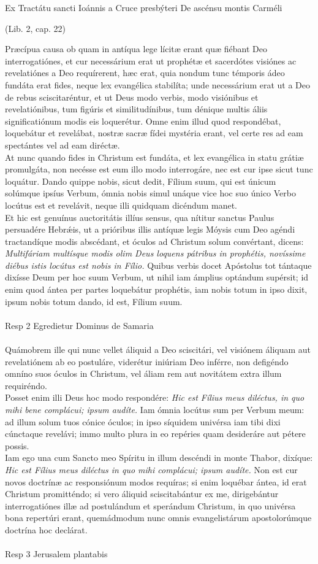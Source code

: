 \documentclass[options]{article}
\begin{document}
Ex Tractátu sancti Ioánnis a Cruce presbýteri De ascénsu montis Carméli
\begin{flushright}
(Lib. 2, cap. 22)	
\end{flushright}
Præcípua causa ob quam in antíqua lege lícitæ erant quæ fiébant Deo interrogatiónes, et cur necessárium erat ut prophétæ et sacerdótes visiónes ac revelatiónes a Deo requírerent, hæc erat, quia nondum tunc témporis ádeo fundáta erat fides, neque lex evangélica stabilíta; unde necessárium erat ut a Deo de rebus sciscitaréntur, et ut Deus modo verbis, modo visiónibus et revelatiónibus, tum figúris et similitudínibus, tum dénique multis áliis significatiónum modis eis loquerétur. Omne enim illud quod respondébat, loquebátur et revelábat, nostræ sacræ fídei mystéria erant, vel certe res ad eam spectántes vel ad eam diréctæ.\\
At nunc quando fides in Christum est fundáta, et lex evangélica in statu grátiæ promulgáta, non necésse est eum illo modo interrogáre, nec est cur ipse sicut tunc loquátur. Dando quippe nobis, sicut dedit, Fílium suum, qui est únicum solúmque ipsíus Verbum, ómnia nobis simul unáque vice hoc suo único Verbo locútus est et revelávit, neque illi quidquam dicéndum manet.\\
Et hic est genuínus auctoritátis illíus sensus, qua nítitur sanctus Paulus persuadére Hebr\'{æ}is, ut a prióribus illis antíquæ legis Móysis cum Deo agéndi tractandíque modis abscédant, et óculos ad Christum solum convértant, dicens: \emph{Multifáriam multísque modis olim Deus loquens pátribus in prophétis, novíssime diébus istis locútus est nobis in Fílio.} Quibus verbis docet Apóstolus tot tántaque dixísse Deum per hoc suum Verbum, ut nihil iam ámplius optándum supérsit; id enim quod ántea per partes loquebátur prophétis, iam nobis totum in ipso dixit, ipsum nobis totum dando, id est, Fílium suum.\\
\\
Resp 2 Egredietur Dominus de Samaria\\
\\
Quámobrem ille qui nunc vellet áliquid a Deo sciscitári, vel visiónem áliquam aut revelatiónem ab eo postuláre, viderétur iniúriam Deo inférre, non defigéndo omníno suos óculos in Christum, vel áliam rem aut novitátem extra illum requiréndo.\\
Posset enim illi Deus hoc modo respondére: \emph{Hic est Fílius meus diléctus, in quo mihi bene complácui; ipsum audíte.} Iam ómnia locútus sum per Verbum meum: ad illum solum tuos cónice óculos; in ipso síquidem univérsa iam tibi dixi cúnctaque revelávi; immo multo plura in eo repéries quam desideráre aut pétere possis.\\
Iam ego una cum Sancto meo Spíritu in illum descéndi in monte Thabor, dixíque: \emph{Hic est Fílius meus diléctus in quo mihi complácui; ipsum audíte.} Non est cur novos doctrínæ ac responsiónum modos requíras; si enim loquébar ántea, id erat Christum promitténdo; si vero áliquid sciscitabántur ex me, dirigebántur interrogatiónes illæ ad postulándum et sperándum Christum, in quo univérsa bona repertúri erant, quemádmodum nunc omnis evangelistárum apostolorúmque doctrína hoc declárat.\\
\\
Resp 3 Jerusalem plantabis
	
\end{document}
